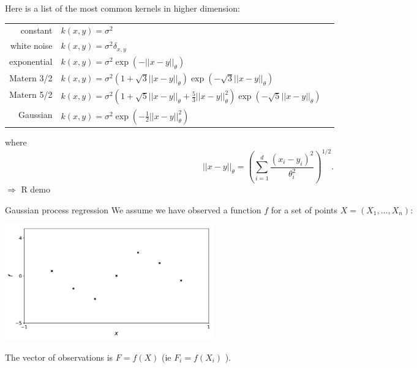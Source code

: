 \documentclass{beamer}
\newcommand\Ni[2]{{|| #1 ||}_{\! #2}}
\begin{document}
\begin{frame}{}
Here is a list of the most common kernels in higher dimension:\\
\vspace{2mm}
\footnotesize
\begin{tabular}{rlN}
		constant & $ \displaystyle k(x,y) = \sigma^2 $ &\\[4mm]
		white noise & $ \displaystyle k(x,y) = \sigma^2 \delta_{x,y} $ &\\[4mm]
		exponential & $\displaystyle k(x,y) = \sigma^2 \exp \left(- \Ni{x-y}{\theta} \right)$ &\\[4mm]
		Matern 3/2 & $\displaystyle k(x,y) = \sigma^2 \left(1 + \sqrt{3}\Ni{x-y}{\theta} \right) \exp \left(- \sqrt{3}\Ni{x-y}{\theta}  \right)$ &\\[4mm]
		Matern 5/2 & $\displaystyle k(x,y) = \sigma^2 \left(1 + \sqrt{5}\Ni{x-y}{\theta} + \frac{5}{3}\Ni{x-y}{\theta}^2 \right) \exp \left(- \sqrt{5}\Ni{x-y}{\theta} \right)$ &\\[4mm]
		Gaussian & $\displaystyle k(x,y) = \sigma^2 \exp \left(- \frac12 \Ni{x-y}{\theta}^2 \right)$ &\\[4mm]
\end{tabular}
\normalsize where
\begin{equation*}
	\Ni{x-y}{\theta} = \left( \sum_{i=1}^d \frac{(x_i-y_i)^2}{\theta_i^2} \right)^{1/2}.
\end{equation*}
\alert{$\Rightarrow$ R demo}
\end{frame}


\begin{frame}{ Gaussian process regression}
We assume we have observed a function $f$ for a set of points $X = (X_1,\dots,X_n)$:
\begin{center}
\includegraphics[height=5cm]{figures/python/gp_obs}
\end{center}
The vector of observations is $F=f(X)$ (ie $F_i = f(X_i)$ ).
\end{frame}
\end{document}

